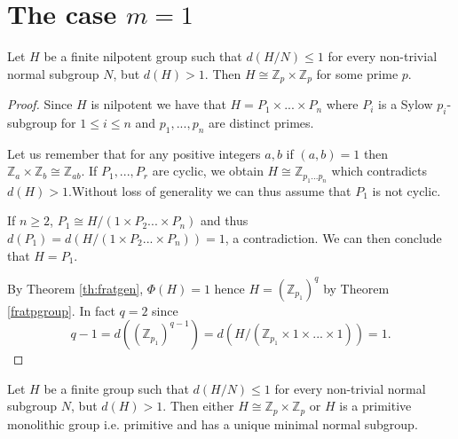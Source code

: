 \section{The case \texorpdfstring{$m=1$}{m=1}}

\begin{theorem}
    \label{nilk1}
    Let $H$ be a finite nilpotent group such that $d(H/N) \le 1$ for every non-trivial normal subgroup $N$, but $d(H) > 1$. Then $H \cong \mathbb{Z}_p \times \mathbb{Z}_p$ for some prime $p$.
\end{theorem}

\begin{proof}
    Since $H$ is nilpotent we have that $H = P_1 \times ... \times P_n$ where $P_i$ is a Sylow $p_i$-subgroup for $1 \le i \le n$ and $p_1,...,p_n$ are distinct primes.
    
    Let us remember that for any positive integers $a, b$ if $(a, b) = 1$ then $\mathbb{Z}_a \times \mathbb{Z}_b \cong \mathbb{Z}_{ab}$. If $P_1,..., P_r$ are cyclic, we obtain $H \cong \mathbb{Z}_{p_1...p_n}$  which contradicts $d(H) > 1$.Without loss of generality we can thus assume that $P_1$ is not cyclic. 
    
    If $n \ge 2$, $P_1 \cong H/(1 \times P_2 ... \times P_n)$ and thus $d(P_1) = d(H/(1 \times P_2 ... \times P_n)) = 1$, a contradiction. We can then conclude that $H = P_1$.

    By Theorem \ref{th:fratgen}, $\Phi(H) = 1$ hence $H = (\mathbb{Z}_{p_1})^q$ by Theorem \ref{fratpgroup}. 
    In fact $q = 2$ since $$q-1 = d((\mathbb{Z}_{p_1})^{q-1}) = d(H/(\mathbb{Z}_{p_1} \times 1 \times ... \times 1)) = 1.$$
\end{proof}

\begin{theorem}
    Let $H$ be a finite group such that $d(H/N) \le 1$ for every non-trivial normal subgroup $N$, but $d(H) > 1$. Then either $H \cong \mathbb{Z}_p \times \mathbb{Z}_p$ or $H$ is a primitive monolithic group i.e. primitive and has a unique minimal normal subgroup.
\end{theorem}

